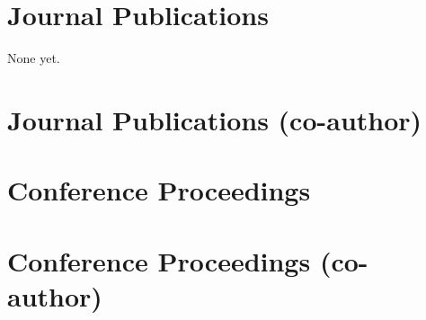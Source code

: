 


\section*{Journal Publications}

None yet.


\section*{Journal Publications (co-author)}


\begin{publist}
 \item {}
 \item {}
\end{publist}


\section*{Conference Proceedings}


\begin{publist}
 \item {}
 \item {}
\end{publist}



\section*{Conference Proceedings (co-author)}


